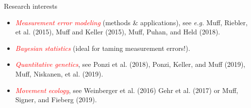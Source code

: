 \documentclass[10pt,ignorenonframetext,]{beamer}
\providecommand{\tightlist}{%
  \setlength{\itemsep}{0pt}\setlength{\parskip}{0pt}}
\begin{document}
\begin{frame}

\begin{block}{Research interests}

\vspace{3mm}

\begin{itemize}
\tightlist
\item
  \emph{\textcolor{red}{Measurement error modeling}} (methods \&
  applications), see \emph{e.g.} Muff, Riebler, et al. (2015), Muff and
  Keller (2015), Muff, Puhan, and Held (2018).
\end{itemize}

\vspace{3mm}

\begin{itemize}
\tightlist
\item
  \emph{\textcolor{red}{Bayesian statistics}} (ideal for taming
  measurement errors!).
\end{itemize}

\vspace{3mm}

\begin{itemize}
\tightlist
\item
  \emph{\textcolor{red}{Quantitative genetics}}, see Ponzi et al.
  (2018), Ponzi, Keller, and Muff (2019), Muff, Niskanen, et al. (2019).
\end{itemize}

\vspace{3mm}

\begin{itemize}
\tightlist
\item
  \emph{\textcolor{red}{Movement ecology}}, see Weinberger et al. (2016)
  Gehr et al. (2017) or Muff, Signer, and Fieberg (2019).
\end{itemize}

\end{block}

\end{frame}
\end{document}
